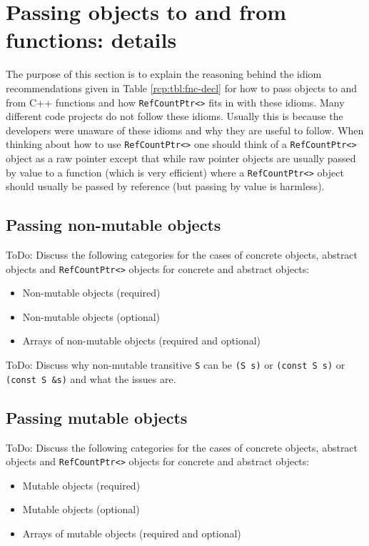 %
\section{Passing objects to and from functions: details}
\label{rcp:apdx:passing_args}
%

The purpose of this section is to explain the reasoning behind the
idiom recommendations given in Table {}\ref{rcp:tbl:fnc-decl} for how
to pass objects to and from C++ functions and how
{}\texttt{RefCountPtr<>} fits in with these idioms.  Many different
code projects do not follow these idioms.  Usually this is because the
developers were unaware of these idioms and why they are useful to
follow.  When thinking about how to use {}\texttt{RefCountPtr<>} one
should think of a {}\texttt{RefCountPtr<>} object as a raw pointer
except that while raw pointer objects are usually passed by value to a
function (which is very efficient) where a {}\texttt{RefCountPtr<>}
object should usually be passed by reference (but passing by value is
harmless).

%
\subsection{Passing non-mutable objects}
%

ToDo: Discuss the following categories for the cases of concrete
objects, abstract objects and {}\texttt{RefCountPtr<>} objects for
concrete and abstract objects:

\begin{itemize}
\item Non-mutable objects (required)
\item Non-mutable objects (optional)
\item Arrays of non-mutable objects (required and optional)
\end{itemize}

ToDo: Discuss why non-mutable transitive {}\texttt{S} can be
{}\texttt{(S s)} or {}\texttt{(const S s)} or {}\texttt{(const S \&s)}
and what the issues are.

%
\subsection{Passing mutable objects}
%

ToDo: Discuss the following categories for the cases of concrete
objects, abstract objects and {}\texttt{RefCountPtr<>} objects for
concrete and abstract objects:

\begin{itemize}
\item Mutable objects (required)
\item Mutable objects (optional)
\item Arrays of mutable objects (required and optional)
\end{itemize}

